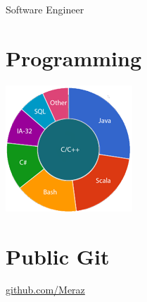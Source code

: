 \documentclass[]{friggeri-cv}
\begin{document}
      {Software Engineer}
      

\begin{aside}
\vspace{3.1cm}

  \section{Programming}
  
    \includegraphics[scale=0.62]{img/programming.png}
    ~
    ~
     \section{Public Git}
    \href{https://github.com/Meraz}{github.com/Meraz}
    ~
    ~

\end{aside}
\end{document}
